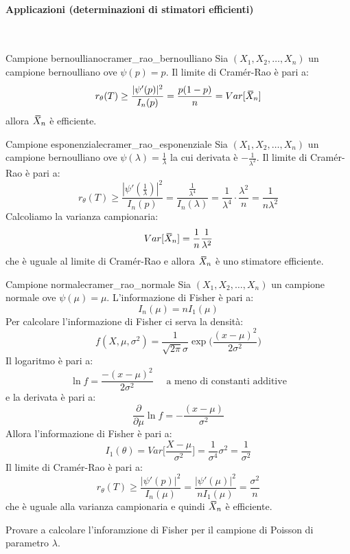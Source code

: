 \documentclass[12pt]{report}
\newcommand{\nmu}{}
\newcommand{\wbar}[1]{%
	\accentset{\mbox{\rule{0.55em}{0.5pt}}}{#1}%
}
\begin{document}
	 \paragraph{Applicazioni (determinazioni di stimatori efficienti)} \quad \\
	 \begin{example}{\nmu Campione bernoulliano}{cramer_rao_bernoulliano}
	 	Sia $(X_1, X_2, \dots, X_n)$ un campione bernoulliano ove $\psi(p) = p$. Il limite di Cramér-Rao è pari a:
	 	\[
	 	r_\theta(T) \geq \frac{|\psi'(p)|^2}{I_n(p)} = \frac{p(1-p)}{n} = Var[\wbar{X}_n]
	 	\]
	 	allora $\wbar{X}_n$ è efficiente.
	 \end{example}
	 \begin{example}{\nmu Campione esponenziale}{cramer_rao_esponenziale}
	 	Sia $(X_1, X_2, \dots, X_n)$ un campione bernoulliano ove $\psi(\lambda) = \frac{1}{\lambda}$ la cui derivata è $-\frac{1}{\lambda^2}$. Il limite di Cramér-Rao è pari a:
	 	\[
	 	r_\theta(T) \geq \frac{|\psi'(\frac{1}{\lambda})|^2}{I_n(p)} = \frac{\frac{1}{\lambda^4}}{I_n(\lambda)} = \frac{1}{\lambda^4} \cdot \frac{\lambda^2}{n} = \frac{1}{n\lambda^2}
	 	\]
	 	Calcoliamo la varianza campionaria:
	 	\[
	 	Var[\wbar{X}_n] = \frac{1}{n}\frac{1}{\lambda^2}
	 	\]
	 	che è uguale al limite di Cramér-Rao e allora $\wbar{X}_n$ è uno stimatore efficiente.
	 \end{example}
	 \begin{example}{\nmu Campione normale}{cramer_rao_normale}
	 	Sia $(X_1, X_2, \dots, X_n)$ un campione normale ove $\psi(\mu) = \mu$. L'informazione di Fisher è pari a:
	 	\[
	 	I_n(\mu) = nI_1(\mu)
	 	\]
	 	Per calcolare l'informazione di Fisher ci serva la densità:
	 	\[
	 	f(X, \mu, \sigma^2) = \frac{1}{\sqrt{2\pi}\sigma}\exp\Bigg(\dfrac{(x-\mu)^2}{2\sigma^2}\Bigg)
	 	\]
	 	Il logaritmo è pari a:
	 	\[
	 	\ln f = \frac{-(x-\mu)^2}{2\sigma^2} \quad \text{ a meno di constanti additive}
	 	\]
	 	e la derivata è pari a:
	 	\[
	 	\frac{\partial}{\partial \mu}\ln f = -\frac{(x - \mu)}{\sigma^2}
	 	\]
	 	Allora l'informazione di Fisher è pari a:
	 	\[
	 	I_1(\theta) = Var\Bigg[\frac{X - \mu}{\sigma^2}\Bigg] = \frac{1}{\sigma^4}\sigma^2 = \frac{1}{\sigma^2}
	 	\]
	 	Il limite di Cramér-Rao è pari a:
	 	\[
	 	r_\theta(T) \geq \frac{|\psi'(p)|^2}{I_n(\mu)} = \frac{|\psi'(\mu)|^2}{nI_1(\mu)} = \frac{\sigma^2}{n}
	 	\]
	 	che è uguale alla varianza campionaria e quindi $\wbar{X}_n$ è efficiente.
	 \end{example}
	 Provare a calcolare l'inforamzione di Fisher per il campione di Poisson di parametro $\lambda$.
\end{document}

